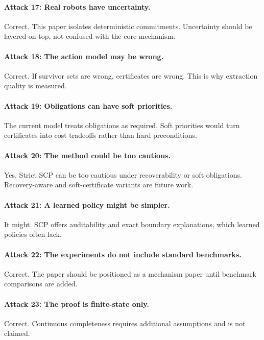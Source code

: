 \documentclass{article}
\begin{document}
\paragraph{Attack 17: Real robots have uncertainty.}
Correct. This paper isolates deterministic commitments. Uncertainty should be layered on top, not confused with the core mechanism.

\paragraph{Attack 18: The action model may be wrong.}
Correct. If survivor sets are wrong, certificates are wrong. This is why extraction quality is measured.

\paragraph{Attack 19: Obligations can have soft priorities.}
The current model treats obligations as required. Soft priorities would turn certificates into cost tradeoffs rather than hard preconditions.

\paragraph{Attack 20: The method could be too cautious.}
Yes. Strict SCP can be too cautious under recoverability or soft obligations. Recovery-aware and soft-certificate variants are future work.

\paragraph{Attack 21: A learned policy might be simpler.}
It might. SCP offers auditability and exact boundary explanations, which learned policies often lack.

\paragraph{Attack 22: The experiments do not include standard benchmarks.}
Correct. The paper should be positioned as a mechanism paper until benchmark comparisons are added.

\paragraph{Attack 23: The proof is finite-state only.}
Correct. Continuous completeness requires additional assumptions and is not claimed.
\end{document}
